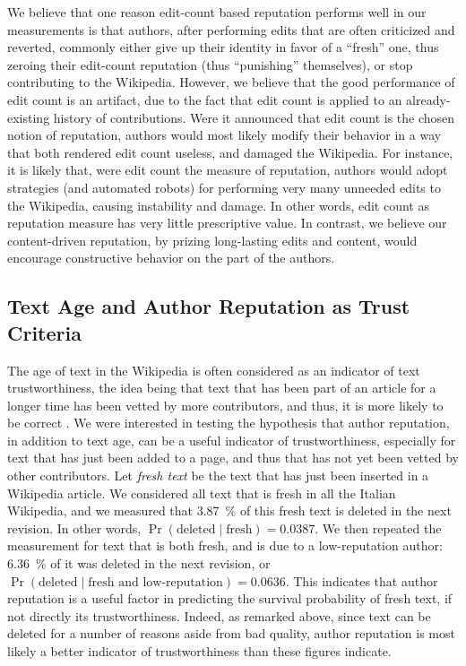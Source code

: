 We believe that one reason edit-count based reputation performs well
in our measurements is that authors, after performing edits that are
often criticized and reverted, commonly either give up their identity
in favor of a ``fresh'' one, thus zeroing their edit-count reputation
(thus ``punishing'' themselves), or stop contributing to the
Wikipedia. 
However, we believe that the good performance of edit count is an
artifact, due to the fact that edit count is applied to an
already-existing history of contributions. 
Were it announced that edit count is the chosen notion of reputation,
authors would most likely modify their behavior in a way that both
rendered edit count useless, and damaged the Wikipedia. 
For instance, it is likely that, were edit count the measure of
reputation, authors would adopt strategies (and automated robots) for
performing very many unneeded edits to the Wikipedia, causing
instability and damage. 
In other words, edit count as reputation measure has very little
prescriptive value. 
In contrast, we believe our content-driven reputation, by prizing
long-lasting edits and content, would encourage constructive behavior
on the part of the authors. 

\subsection{Text Age and Author Reputation as Trust Criteria}

The age of text in the Wikipedia is often considered as an
indicator of text trustworthiness, the idea being that text that has
been part of an article for a longer time has been vetted by more
contributors, and thus, it is more likely to be correct \cite{Cr06}. 
We were interested in testing the hypothesis that author reputation,
in addition to text age, can be a useful indicator of
trustworthiness, especially for text that has just been added to a
page, and thus that has not yet been vetted by other contributors.
Let {\em fresh text\/} be the text that has just been inserted in a
Wikipedia article. 
We considered all text that is fresh in all the Italian
Wikipedia, and we measured that 3.87~\% of this fresh text is deleted
in the next revision.  In other words,
$\Pr(\mbox{deleted}\mid\mbox{fresh}) = 0.0387$. 
We then repeated the measurement for text that is both fresh, and is
due to a low-reputation author: 6.36~\% of it was deleted in the next
revision, or 
$\Pr(\mbox{deleted}\mid\mbox{fresh and low-reputation}) = 0.0636$. 
This indicates that author reputation is a useful factor in predicting
the survival probability of fresh text, if not directly its
trustworthiness. 
Indeed, as remarked above, since text can be deleted for a number of
reasons aside from bad quality, author reputation is most likely a
better indicator of trustworthiness than these figures indicate. 


